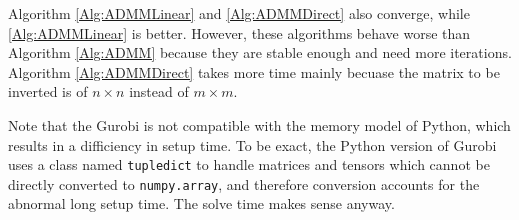\documentclass[english]{pkupaper}
\begin{document}
Algorithm \ref{Alg:ADMMLinear} and \ref{Alg:ADMMDirect} also converge, while \ref{Alg:ADMMLinear} is better. However, these algorithms behave worse than Algorithm \ref{Alg:ADMM} because they are stable enough and need more iterations. Algorithm \ref{Alg:ADMMDirect} takes more time mainly becuase the matrix to be inverted is of $ n \times n $ instead of $ m \times m $.

Note that the Gurobi is not compatible with the memory model of Python, which results in a difficiency in setup time. To be exact, the Python version of Gurobi uses a class named \verb"tupledict" to handle matrices and tensors which cannot be directly converted to \verb"numpy.array", and therefore conversion accounts for the abnormal long setup time. The solve time makes sense anyway.

	
\end{document}
